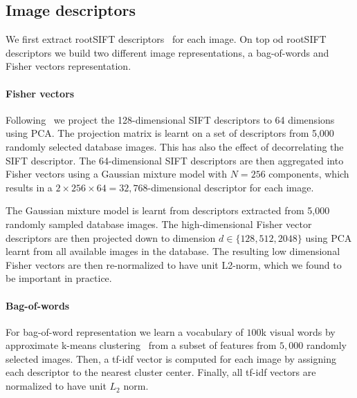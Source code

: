        \subsection{Image descriptors}
        We first extract rootSIFT descriptors~\cite{Arandjelovic12} for each image. On top od rootSIFT descriptors we build two different image representations, a bag-of-words and Fisher vectors representation.

        \paragraph{Fisher vectors}
        Following~\cite{Jegou12} we project the 128-dimensional SIFT descriptors to 64 dimensions using PCA. The projection matrix is learnt on a set of descriptors from 5,000 randomly selected database images. This has also the effect of decorrelating the SIFT descriptor. The 64-dimensional SIFT descriptors are then aggregated into Fisher vectors using a Gaussian mixture model with $N=256$ components, which results in a $2\times256\times64 = 32,768$-dimensional descriptor for each image.  
      
        The Gaussian mixture model is learnt from descriptors extracted from 5,000 randomly sampled database images. The  high-dimensional Fisher vector descriptors are then projected down to dimension $d\in\{128,512, 2048\}$ using PCA learnt from all available images in the database. The resulting low dimensional Fisher vectors are then re-normalized to have unit L2-norm, which we found to be important in practice.

        \paragraph{Bag-of-words}
        For bag-of-word representation we learn a vocabulary of $100$k visual words by approximate k-means clustering~\cite{Philbin07} from a subset of features from $5,000$ randomly selected images. Then, a tf-idf vector is computed for each image by assigning each descriptor to the nearest cluster center.  Finally, all tf-idf vectors are normalized to have unit $L_2$ norm.

